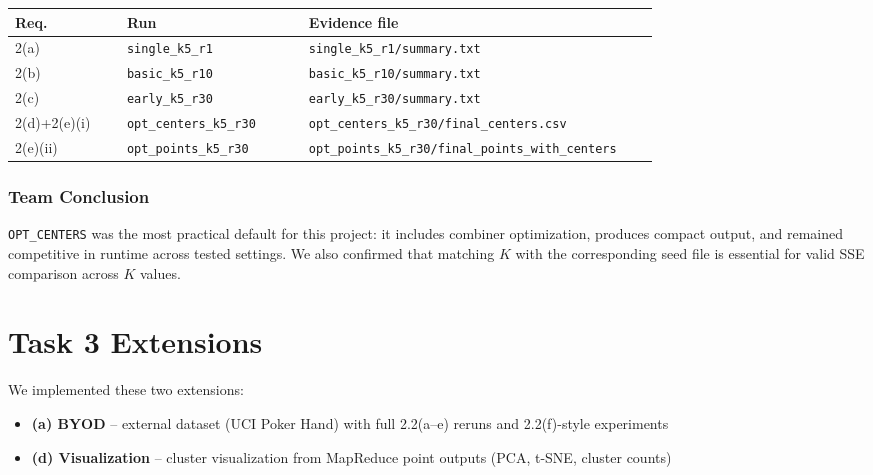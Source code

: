 \documentclass[11pt]{article}
\begin{document}
{\small
\begin{longtable}{@{}p{0.16\linewidth}p{0.26\linewidth}p{0.50\linewidth}@{}}
  \rowcolor{tableheader}
  \color{white}\textbf{Req.} &
  \color{white}\textbf{Run} &
  \color{white}\textbf{Evidence file} \\
  \midrule\endhead
  2(a) & \texttt{single\_k5\_r1}       & \texttt{single\_k5\_r1/summary.txt} \\
  \rowcolor{tablealt}
  2(b) & \texttt{basic\_k5\_r10}       & \texttt{basic\_k5\_r10/summary.txt} \\
  2(c) & \texttt{early\_k5\_r30}       & \texttt{early\_k5\_r30/summary.txt} \\
  \rowcolor{tablealt}
  2(d)+2(e)(i) & \texttt{opt\_centers\_k5\_r30} & \texttt{opt\_centers\_k5\_r30/final\_centers.csv} \\
  2(e)(ii) & \texttt{opt\_points\_k5\_r30}  & \texttt{opt\_points\_k5\_r30/final\_points\_with\_centers} \\
\end{longtable}
\normalsize}

\subsubsection*{Team Conclusion}

\texttt{OPT\_CENTERS} was the most practical default for this project: it includes combiner optimization, produces compact output, and remained competitive in runtime across tested settings. We also confirmed that matching $K$ with the corresponding seed file is essential for valid SSE comparison across $K$ values.

\section{Task 3 Extensions}

We implemented these two extensions:
\begin{itemize}[noitemsep,topsep=2pt]
  \item \textbf{(a) BYOD} -- external dataset (UCI Poker Hand) with full 2.2(a--e) reruns and 2.2(f)-style experiments
  \item \textbf{(d) Visualization} -- cluster visualization from MapReduce point outputs (PCA, t-SNE, cluster counts)
\end{itemize}
\end{document}
